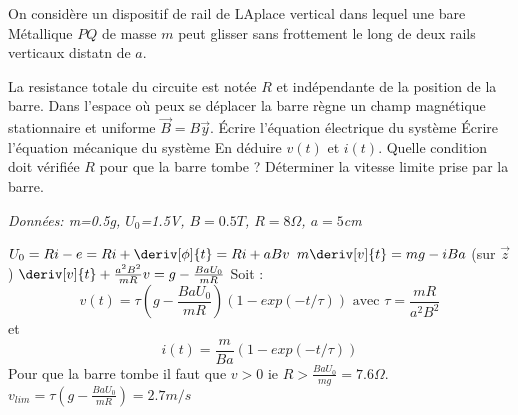 \begin{Exercise}[title=Rail de Laplace Vertical]
  On considère un dispositif de rail de LAplace vertical dans lequel une bare Métallique $PQ$ de masse $m$ peut glisser sans frottement le long de deux rails verticaux distatn de $a$.

  La resistance totale du circuite est notée $R$ et indépendante de la position de la barre. Dans l'espace où peux se déplacer la barre règne un champ magnétique stationnaire et uniforme $\vec{B}=B\vec{y}$.
  \Question Écrire l'équation électrique du système
  \Question Écrire l'équation mécanique du système
  \Question En déduire $v(t)$  et $i(t)$.
  \Question Quelle condition doit vérifiée $R$ pour que la barre tombe ?
  \Question Déterminer la vitesse limite prise par la barre.
  \begin{center}
  \end{center}
  \emph{Données: m=0.5g, $U_{0}$=1.5V, $B=0.5T$, $R=8\Omega$, $a=5$cm}
\end{Exercise}
\begin{Answer}
  \Question $U_{0} = Ri-e =Ri+\deriv[\phi]{t}=Ri+aBv$
  \Question $ m \deriv[v]{t} = mg - iBa$ (sur $\vec{z}$)
  \Question $\deriv[v]{t}+\frac{a^{2}B^{2}}{mR}v = g-\frac{BaU_{0}}{mR}$
  Soit :
  \[
    v(t)= \tau(g-\frac{BaU_{0}}{mR})(1-exp(-t/\tau))\text{ avec } \tau= \frac{mR}{a^{2}B^{2}}
  \]
  et
  \[
    i(t)= \frac{m}{Ba}(1-exp(-t/\tau))
  \]
  \Question Pour que la barre tombe il faut que $v>0$ ie $R> \frac{BaU_{0}}{mg}=7.6\Omega$.
  \Question $v_{lim}=\tau (g-\frac{BaU_{0}}{mR})=2.7m/s$
\end{Answer}
